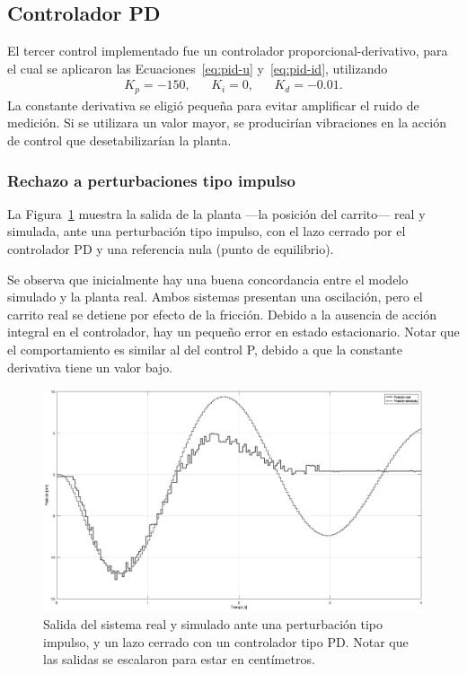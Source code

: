 \subsection{Controlador PD}

El tercer control implementado fue un controlador proporcional-derivativo, para el cual se aplicaron las Ecuaciones~\eqref{eq:pid-u} y~\eqref{eq:pid-id}, utilizando
\begin{align*}
    K_p = -150, && K_i = 0, && K_d = -0.01.
\end{align*}
La constante derivativa se eligió pequeña para evitar amplificar el ruido de medición. Si se utilizara un valor mayor, se producirían vibraciones en la acción de control que desetabilizarían la planta.

\subsubsection{Rechazo a perturbaciones tipo impulso}

La Figura~\ref{fig:pd-pert-salida} muestra la salida de la planta ---la posición del carrito--- real y simulada, ante una perturbación tipo impulso, con el lazo cerrado por el controlador PD y una referencia nula (punto de equilibrio).

Se observa que inicialmente hay una buena concordancia entre el modelo simulado y la planta real. Ambos sistemas presentan una oscilación, pero el carrito real se detiene por efecto de la fricción. Debido a la ausencia de acción integral en el controlador, hay un pequeño error en estado estacionario. Notar que el comportamiento es similar al del control P, debido a que la constante derivativa tiene un valor bajo.

\begin{figure}[!tbp]
    \centering
    \includegraphics[width=\linewidth]{img/pd-pert-salida.eps}
    \caption{Salida del sistema real y simulado ante una perturbación tipo impulso, y un lazo cerrado con un controlador tipo PD. Notar que las salidas se escalaron para estar en centímetros.}
    \label{fig:pd-pert-salida}
\end{figure}

